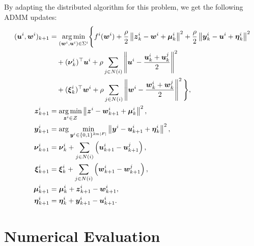 \documentclass[11pt,a4paper]{article}
\theoremstyle{plain}
\theoremstyle{definition}
\theoremstyle{remark}
\begin{document}
	By adapting the distributed algorithm for this problem, we get the following ADMM updates:
	\begin{subequations}
		\begin{align}
			(\boldsymbol{u}^i, \boldsymbol{w}^i)_{k+1} &= 
			\underset{(\boldsymbol{w}^i, \boldsymbol{u}^i) \in \Sigma^i}{\arg \min} 
			\Bigg\{
			f^i(\boldsymbol{w}^i)
			+ \frac{\rho}{2} \left\| \boldsymbol{z}^i_k - \boldsymbol{w}^i + \boldsymbol{\mu}^i_k \right\|^2
			+ \frac{\rho}{2} \left\| \boldsymbol{y}_k^i - \boldsymbol{u}^i + \boldsymbol{\eta}_k^i \right\|^2 \notag\\
			&\quad + (\boldsymbol{\nu}_k^i)^{\top} \boldsymbol{u}^i
			+ \rho \sum_{j \in N(i)} \left\| \boldsymbol{u}^i - \frac{\boldsymbol{u}_k^i + \boldsymbol{u}_k^j}{2} \right\|^2 \label{dist-start} \\
			&\quad + (\boldsymbol{\xi}_k^i)^{\top} \boldsymbol{w}^i
			+ \rho \sum_{j \in N(i)} \left\| \boldsymbol{w}^i - \frac{\boldsymbol{w}_k^i + \boldsymbol{w}_k^j}{2} \right\|^2
			\Bigg\}, \notag\\
			\boldsymbol{z}_{k+1}^i &= 
			\underset{\boldsymbol{z}^i \in \mathcal{Z}}{\arg \min}
			\left\| \boldsymbol{z}^i - \boldsymbol{w}_{k+1}^i + \boldsymbol{\mu}_k^i \right\|^2, \\
			\boldsymbol{y}_{k+1}^i &= 
			\arg \min_{\boldsymbol{y}^i \in \{0,1\}^{2m|F|}}
			\left\| \boldsymbol{y}^i - \boldsymbol{u}_{k+1}^i + \boldsymbol{\eta}_k^i \right\|^2, \\
			\boldsymbol{\nu}_{k+1}^i &= 
			\boldsymbol{\nu}_k^i + \sum_{j \in N(i)} \left( \boldsymbol{u}_{k+1}^i - \boldsymbol{u}_{k+1}^j \right), \\
			\boldsymbol{\xi}_{k+1}^i &= 
			\boldsymbol{\xi}_k^i + \sum_{j \in N(i)} \left( \boldsymbol{w}_{k+1}^i - \boldsymbol{w}_{k+1}^j \right), \\
			\boldsymbol{\mu}_{k+1}^i &= 
			\boldsymbol{\mu}_k^i + \boldsymbol{z}_{k+1}^i - \boldsymbol{w}_{k+1}^i, \\
			\boldsymbol{\eta}_{k+1}^i &= 
			\boldsymbol{\eta}_k^i + \boldsymbol{y}_{k+1}^i - \boldsymbol{u}_{k+1}^i.\label{dist-end}
		\end{align}
	\end{subequations}
	
	
	\section{Numerical Evaluation}
	\label{sec:numerical}
	
\end{document}

